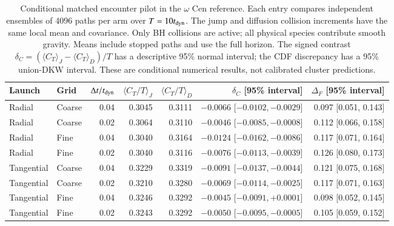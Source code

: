\begin{table}[t]
\caption{Conditional matched encounter pilot in the $\omega$ Cen reference. Each entry compares independent ensembles of 4096 paths per arm over $T=10t_{\rm dyn}$. The jump and diffusion collision increments have the same local mean and covariance. Only BH collisions are active; all physical species contribute smooth gravity. Means include stopped paths and use the full horizon. The signed contrast $\delta_C=(\langle C_T\rangle_J-\langle C_T\rangle_D)/T$ has a descriptive 95\% normal interval; the CDF discrepancy has a 95\% union-DKW interval. These are conditional numerical results, not calibrated cluster predictions.}\label{tab:matched-residence}
\centering\begin{tabular}{llrrrrr}
\toprule
Launch & Grid & $\Delta t/t_{\rm dyn}$ & $\langle C_T/T\rangle_J$ & $\langle C_T/T\rangle_D$ & $\delta_C$ [95\% interval] & $\Delta_F$ [95\% interval] \\
\midrule
Radial & Coarse & 0.04 & 0.3045 & 0.3111 & $-0.0066$ [$ -0.0102, -0.0029$] & 0.097 [0.051, 0.143] \\
Radial & Coarse & 0.02 & 0.3064 & 0.3110 & $-0.0046$ [$ -0.0085, -0.0008$] & 0.112 [0.066, 0.158] \\
Radial & Fine & 0.04 & 0.3040 & 0.3164 & $-0.0124$ [$ -0.0162, -0.0086$] & 0.117 [0.071, 0.164] \\
Radial & Fine & 0.02 & 0.3040 & 0.3116 & $-0.0076$ [$ -0.0113, -0.0039$] & 0.126 [0.080, 0.173] \\
Tangential & Coarse & 0.04 & 0.3229 & 0.3319 & $-0.0091$ [$ -0.0137, -0.0044$] & 0.121 [0.075, 0.168] \\
Tangential & Coarse & 0.02 & 0.3210 & 0.3280 & $-0.0069$ [$ -0.0114, -0.0025$] & 0.117 [0.071, 0.163] \\
Tangential & Fine & 0.04 & 0.3246 & 0.3292 & $-0.0045$ [$ -0.0091, +0.0001$] & 0.098 [0.052, 0.145] \\
Tangential & Fine & 0.02 & 0.3243 & 0.3292 & $-0.0050$ [$ -0.0095, -0.0005$] & 0.105 [0.059, 0.152] \\
\bottomrule
\end{tabular}
\end{table}
